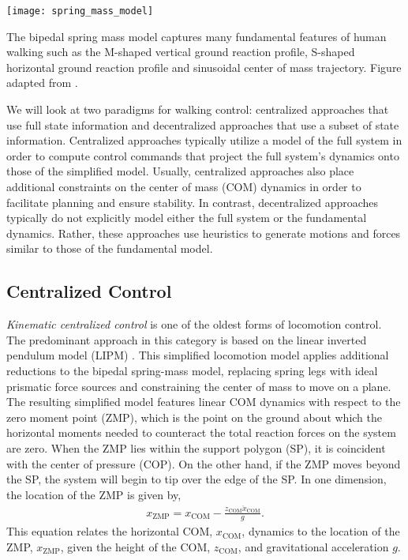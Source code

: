 \begin{marginfigure}
    \centering
    \texttt{[image: spring\_mass\_model]}
    \caption{The bipedal spring mass model captures many fundamental features of
    human walking such as the M-shaped vertical ground reaction profile,
    S-shaped horizontal ground reaction profile and sinusoidal center of mass
    trajectory. Figure adapted from \citet{geyer2006compliant}.}
    \label{fig:ssm_diagram}
\end{marginfigure}

We will look at two paradigms for walking control: centralized approaches that
use full state information and decentralized approaches that use a subset of
state information. Centralized approaches typically utilize a model of the full
system in order to compute control commands that project the full system's
dynamics onto those of the simplified model. Usually, centralized approaches
also place additional constraints on the center of mass (COM) dynamics in order
to facilitate planning and ensure stability. In contrast, decentralized
approaches typically do not explicitly model either the full system or the
fundamental dynamics.  Rather, these approaches use heuristics to generate
motions and forces similar to those of the fundamental model.

\subsection{Centralized Control}\label{sec:back_centralized_control}

\emph{Kinematic centralized control} is one of the oldest forms of locomotion
control. The predominant approach in this category is based on the linear
inverted pendulum model (LIPM) \citep{kajita1991study, kajita20013d}.  This
simplified locomotion model applies additional reductions to the bipedal
spring-mass model, replacing spring legs with ideal prismatic force sources and
constraining the center of mass to move on a plane. The resulting simplified
model features linear COM dynamics with respect to the zero moment point (ZMP),
which is the point on the ground about which the horizontal moments needed to
counteract the total reaction forces on the system are zero. When the ZMP lies
within the support polygon (SP), it is coincident with the center of pressure (COP). On the other
hand, if the ZMP moves beyond the SP, the system will begin to tip over the edge
of the SP. In one dimension, the location of the ZMP is given by, 
\begin{align} 
    x_\textrm{ZMP} = x_\textrm{COM} - \frac{z_\textrm{COM}
        \ddot{x}_\textrm{COM}}{g}. 
    \label{eq:ZMP}
\end{align}
This equation relates the horizontal COM, $x_\textrm{COM}$, dynamics to the
location of the ZMP, $x_\textrm{ZMP}$, given the height of the COM,
$z_\textrm{COM}$, and gravitational acceleration $g$.


